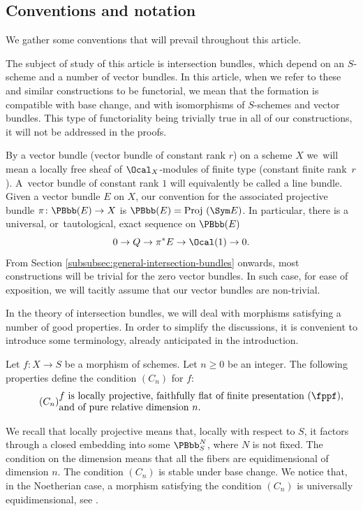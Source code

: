 \subsection{Conventions and notation}\label{subsec:conventions-notations}
We gather some conventions that will prevail throughout this article.

The subject of study of this article is intersection bundles, which depend on an $S$-scheme and a number of vector bundles. In this article, when we refer to these and similar constructions to be functorial, we mean that the formation is compatible with base change, and with isomorphisms of $S$-schemes and vector bundles. This type of functoriality being trivially true in all of our constructions, it will not be addressed in the proofs.

By a vector bundle (\resp vector bundle of constant rank $r$) on a scheme $X$ we~will mean a locally free sheaf of $\Ocal_{X}$-modules of finite type (\resp constant finite rank~$r$). A~vector bundle of constant rank $1$ will equivalently be called a line bundle. Given a vector bundle $E$ on $X$, our convention for the associated projective bundle \hbox{$\pi\colon\PBbb(E)\to X$} is $\PBbb(E)=\mathrm{Proj}\ (\Sym E)$. In particular, there is a universal, or~tautological, exact sequence on $\PBbb(E)$\vspace*{-3pt}\enlargethispage{\baselineskip}
\begin{equation}\label{eq:tautological-exact-sequence}
0 \to Q \to \pi^\ast E \to \Ocal(1) \to 0.
\end{equation}
From Section \ref{subsubsec:general-intersection-bundles} onwards, most constructions will be trivial for the zero vector bundles. In such case, for ease of exposition, we will tacitly assume that our vector bundles are non-trivial.

In the theory of intersection bundles, we will deal with morphisms satisfying a number of good properties. In order to simplify the discussions, it is convenient to introduce some terminology, already anticipated in the introduction.

\begin{definition}
Let $f \colon X \to S$ be a morphism of schemes. Let $n\geq 0 $ be an integer. The following properties define the condition $(C_n)$ for $f$:
\begin{equation}\tag{$C_n$}\label{condition-Cn}
\begin{split}
&f \text{ is locally projective, faithfully flat of finite presentation (\fppf),}
\\[-3.5pt]
& \text{and of pure relative dimension }n.
\end{split}
\end{equation}
\end{definition}
We recall that locally projective means that, locally with respect to $S$, it factors through a closed embedding into some $\PBbb^N_S$, where $N$ is not fixed. The condition on the dimension means that all the fibers are equidimensional of dimension $n$. The condition $(C_{n})$ is stable under base change. We notice that, in the Noetherian case, a morphism satisfying the condition $(C_{n})$ is universally equidimensional, see \cite[Def.\,2.1.2 \& Prop.\,2.1.7 (2)]{Suslin-Voevodsky}.

